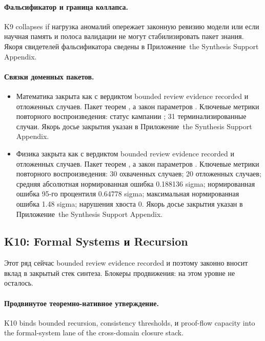 \paragraph{Фальсификатор и граница коллапса.}
K9 collapses if нагрузка аномалий опережает законную ревизию модели или если научная память и полоса валидации не могут стабилизировать пакет знания.
Якоря свидетелей фальсификатора сведены в Приложение~the Synthesis Support Appendix.

\paragraph{Связки доменных пакетов.}
\begin{itemize}[leftmargin=1.6em,nosep]
\item Математика закрыта как  с вердиктом bounded review evidence recorded и  отложенных случаев. Пакет теорем , а закон параметров . Ключевые метрики повторного воспроизведения: статус кампании ; 31 терминализированные случаи. Якорь досье закрытия указан в Приложение~the Synthesis Support Appendix.
\item Физика закрыта как  с вердиктом bounded review evidence recorded и  отложенных случаев. Пакет теорем , а закон параметров . Ключевые метрики повторного воспроизведения: 30 охваченных случаев; 20 отложенных случаев; средняя абсолютная нормированная ошибка 0.188136 sigma; нормированная ошибка 95-го процентиля 0.64778 sigma; максимальная нормированная ошибка 1.48 sigma; нарушения хвоста 0. Якорь досье закрытия указан в Приложение~the Synthesis Support Appendix.
\end{itemize}

\subsection{K10: Formal Systems и Recursion}
\label{sec:oc-core-1-3-synthesis-k10}
Этот ряд сейчас bounded review evidence recorded и поэтому законно вносит вклад в закрытый стек синтеза.
Блокеры продвижения: на этом уровне не осталось.

\paragraph{Продвинутое теоремно-нативное утверждение.}
K10 binds bounded recursion, consistency thresholds, и proof-flow capacity into the formal-system lane of the cross-domain closure stack.


